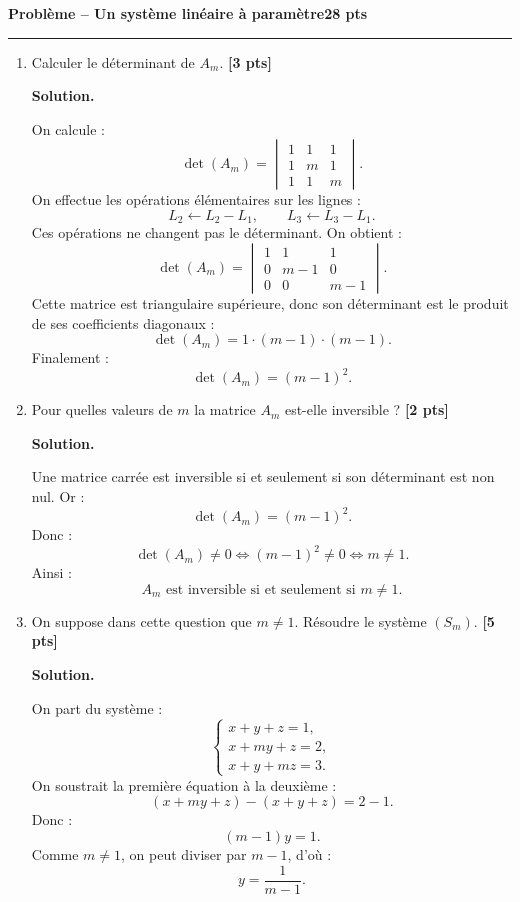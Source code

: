 \documentclass[11pt,a4paper]{article}
\newcommand{\pts}[1]{\hfill \textbf{[#1 pts]}}
\newcounter{probleme}
\newenvironment{probleme}[2]{
    \refstepcounter{probleme}
    \vspace{0.6cm}
    {\Large\color{bleu}\textbf{Problème \theprobleme{} -- #1}}\hfill \textbf{#2 pts}
    \par\medskip
    \hrule
    \medskip
}{\vspace{0.5cm}}
\newcommand{\solution}{
    \textbf{\color{bleu}Solution. }
}
\begin{document}
\begin{probleme}{Un système linéaire à paramètre}{28}
\begin{enumerate}
    \item Calculer le déterminant de \(A_m\). \pts{3}

    \solution

    On calcule :
    \[
    \det(A_m)=
    \begin{vmatrix}
    1&1&1\\
    1&m&1\\
    1&1&m
    \end{vmatrix}.
    \]
    On effectue les opérations élémentaires sur les lignes :
    \[
    L_2\leftarrow L_2-L_1,
    \qquad
    L_3\leftarrow L_3-L_1.
    \]
    Ces opérations ne changent pas le déterminant. On obtient :
    \[
    \det(A_m)=
    \begin{vmatrix}
    1&1&1\\
    0&m-1&0\\
    0&0&m-1
    \end{vmatrix}.
    \]
    Cette matrice est triangulaire supérieure, donc son déterminant est le produit de ses coefficients diagonaux :
    \[
    \det(A_m)=1\cdot (m-1)\cdot (m-1).
    \]
    Finalement :
    \[
    \boxed{\det(A_m)=(m-1)^2.}
    \]

    \item Pour quelles valeurs de \(m\) la matrice \(A_m\) est-elle inversible ? \pts{2}

    \solution

    Une matrice carrée est inversible si et seulement si son déterminant est non nul. Or :
    \[
    \det(A_m)=(m-1)^2.
    \]
    Donc :
    \[
    \det(A_m)\neq 0
    \Longleftrightarrow
    (m-1)^2\neq 0
    \Longleftrightarrow
    m\neq 1.
    \]
    Ainsi :
    \[
    \boxed{A_m \text{ est inversible si et seulement si } m\neq 1.}
    \]

    \item On suppose dans cette question que \(m\neq 1\).
    Résoudre le système \((S_m)\). \pts{5}

    \solution

    On part du système :
    \[
    \begin{cases}
    x+y+z=1,\\
    x+my+z=2,\\
    x+y+mz=3.
    \end{cases}
    \]
    On soustrait la première équation à la deuxième :
    \[
    (x+my+z)-(x+y+z)=2-1.
    \]
    Donc :
    \[
    (m-1)y=1.
    \]
    Comme \(m\neq 1\), on peut diviser par \(m-1\), d'où :
    \[
    y=\frac{1}{m-1}.
    \]


\end{enumerate}
\end{probleme}
\end{document}

